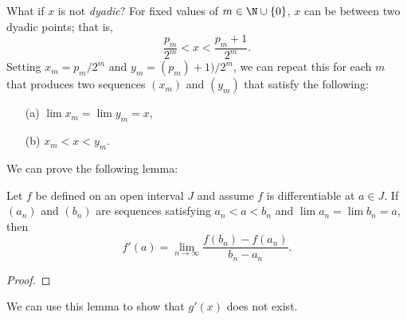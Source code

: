 What if \( x  \) is not \textit{dyadic}? For fixed values of \( m \in \N \cup \{ 0  \}  \), \( x  \) can be between two dyadic points; that is, 
\[  \frac{ p_m  }{ 2^m } < x < \frac{ p_m + 1  }{ 2^m }. \] Setting \( x_m = p_m / 2^m \) and \( y_m = (p_m) + 1) / 2^m  \), we can repeat this for each \( m  \) that produces two sequences \( (x_m)  \) and \( (y_m)  \) that satisfy the following:
\begin{enumerate}
    \item[(a)] \( \lim x_m = \lim y_m = x   \), 
    \item[(b)] \( x_m < x < y_m \).
\end{enumerate}

We can prove the following lemma:

\begin{tcolorbox}
\begin{lem}
Let \( f  \) be defined on an open interval \( J  \) and assume \( f  \) is differentiable at \( a \in J  \). If \( (a_n)  \) and \( (b_n)  \) are sequences satisfying \( a_n < a < b_n  \) and \( \lim a_n = \lim b_n = a  \), then 
\[ f'(a) = \lim_{ n \to \infty  } \frac{ f(b_n) - f(a_n)  }{ b_n - a_n  }. \]
\end{lem}
\end{tcolorbox}
\begin{proof}

\end{proof}
We can use this lemma to show that \( g'(x)  \) does not exist.




